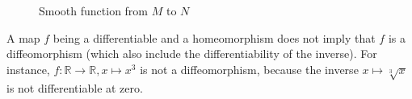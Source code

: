 \begin{figure}[ht]
    \centering
    \caption{Smooth function from $M$ to $N$}
    \label{fig:smooth-function-from-m-to-n}
\end{figure}

\begin{remark}
A map $f$ being a differentiable and a homeomorphism does not imply that $f$ is a diffeomorphism (which also include the differentiability of the inverse).
For instance, $f\colon \mathbb R\to \mathbb R, x\mapsto x^3$ is not a diffeomorphism, because the inverse $x\mapsto \sqrt[3]{x}$ is not differentiable at zero.
\end{remark}
